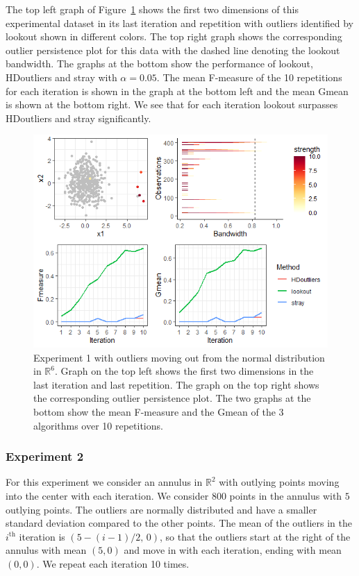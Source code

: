 \documentclass[letter,12pt]{article}
\begin{document}
The top left graph of Figure~\ref{fig:ComparisonEx1} shows the first two dimensions of this experimental dataset in its last iteration and repetition with outliers identified by lookout shown in different colors. The top right graph shows the corresponding outlier persistence plot for this data with the dashed line denoting the lookout bandwidth. The graphs at the bottom show the performance of lookout, HDoutliers and stray with $\alpha = 0.05$. The mean F-measure of the 10 repetitions for each iteration is shown in the graph at the bottom left and the mean Gmean is shown at the bottom right. We see that for each iteration lookout surpasses HDoutliers and stray significantly. 

\begin{figure}[!ht]
    \centering
    \includegraphics[scale=0.8]{Graphics/Comparison_Ex1.png}
    \caption{Experiment 1 with outliers moving out from the normal distribution in $\mathbb{R}^6$. Graph on the top left shows the first two dimensions in the last iteration and last repetition. The graph on the top right shows the corresponding outlier persistence plot. The  two graphs at the bottom show the mean F-measure and the Gmean of the 3 algorithms over 10 repetitions. }
    \label{fig:ComparisonEx1}
\end{figure}

\subsubsection{Experiment 2}\label{sec:exp2}
For this experiment we consider an annulus in $\mathbb{R}^2$ with outlying points moving into the center with each iteration.  We consider $800$ points in the annulus with $5$ outlying points. The outliers are normally distributed and have a smaller standard deviation compared to the other points. The mean of the outliers in the $i^{\text{th}}$ iteration is $\left( 5 - (i-1) /2, \, 0 \right)$, so that the outliers start at the right of the annulus with mean $(5,0)$ and move in with each iteration, ending with mean $(0,0)$.  We repeat each iteration 10 times. 
\end{document}
